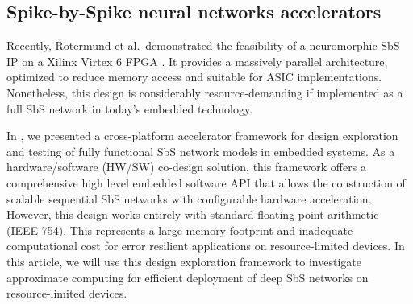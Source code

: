 \subsection{Spike-by-Spike neural networks accelerators}
Recently, Rotermund et al.\ demonstrated the feasibility of a neuromorphic SbS IP on a Xilinx Virtex 6 FPGA \cite{rotermund2018massively}. It provides a massively parallel architecture, optimized to reduce memory access and suitable for ASIC implementations. Nonetheless, this design is considerably resource-demanding if implemented as a full SbS network in today's embedded technology.

In \cite{nevarez2020accelerator}, we presented a cross-platform accelerator framework for design exploration and testing of fully functional SbS network models in embedded systems. As a hardware/software (HW/SW) co-design solution, this framework offers a comprehensive high level embedded software API that allows the construction of scalable sequential SbS networks with configurable hardware acceleration.
\REVIEW
{However, this design works entirely with standard floating-point arithmetic (IEEE 754). This represents a large memory footprint and inadequate computational cost for error resilient applications on resource-limited devices.
}
 In this article, we will use this design exploration framework to investigate approximate computing for efficient deployment of deep SbS networks on resource-limited devices.
